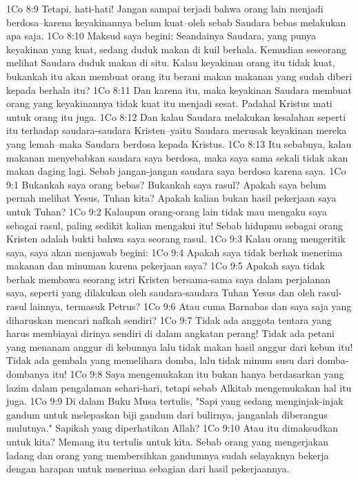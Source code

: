 1Co 8:9  Tetapi, hati-hati! Jangan sampai terjadi bahwa orang lain menjadi berdosa--karena keyakinannya belum kuat--oleh sebab Saudara bebas melakukan apa saja.
1Co 8:10  Maksud saya begini: Seandainya Saudara, yang punya keyakinan yang kuat, sedang duduk makan di kuil berhala. Kemudian seseorang melihat Saudara duduk makan di situ. Kalau keyakinan orang itu tidak kuat, bukankah itu akan membuat orang itu berani makan makanan yang sudah diberi kepada berhala itu?
1Co 8:11  Dan karena itu, maka keyakinan Saudara membuat orang yang keyakinannya tidak kuat itu menjadi sesat. Padahal Kristus mati untuk orang itu juga.
1Co 8:12  Dan kalau Saudara melakukan kesalahan seperti itu terhadap saudara-saudara Kristen--yaitu Saudara merusak keyakinan mereka yang lemah--maka Saudara berdosa kepada Kristus.
1Co 8:13  Itu sebabnya, kalau makanan menyebabkan saudara saya berdosa, maka saya sama sekali tidak akan makan daging lagi. Sebab jangan-jangan saudara saya berdosa karena saya.
1Co 9:1  Bukankah saya orang bebas? Bukankah saya rasul? Apakah saya belum pernah melihat Yesus, Tuhan kita? Apakah kalian bukan hasil pekerjaan saya untuk Tuhan?
1Co 9:2  Kalaupun orang-orang lain tidak mau mengaku saya sebagai rasul, paling sedikit kalian mengakui itu! Sebab hidupmu sebagai orang Kristen adalah bukti bahwa saya seorang rasul.
1Co 9:3  Kalau orang mengeritik saya, saya akan menjawab begini:
1Co 9:4  Apakah saya tidak berhak menerima makanan dan minuman karena pekerjaan saya?
1Co 9:5  Apakah saya tidak berhak membawa seorang istri Kristen bersama-sama saya dalam perjalanan saya, seperti yang dilakukan oleh saudara-saudara Tuhan Yesus dan oleh rasul-rasul lainnya, termasuk Petrus?
1Co 9:6  Atau cuma Barnabas dan saya saja yang diharuskan mencari nafkah sendiri?
1Co 9:7  Tidak ada anggota tentara yang harus membiayai dirinya sendiri di dalam angkatan perang! Tidak ada petani yang menanam anggur di kebunnya lalu tidak makan hasil anggur dari kebun itu! Tidak ada gembala yang memelihara domba, lalu tidak minum susu dari domba-dombanya itu!
1Co 9:8  Saya mengemukakan itu bukan hanya berdasarkan yang lazim dalam pengalaman sehari-hari, tetapi sebab Alkitab mengemukakan hal itu juga.
1Co 9:9  Di dalam Buku Musa tertulis, "Sapi yang sedang menginjak-injak gandum untuk melepaskan biji gandum dari bulirnya, janganlah diberangus mulutnya." Sapikah yang diperhatikan Allah?
1Co 9:10  Atau itu dimaksudkan untuk kita? Memang itu tertulis untuk kita. Sebab orang yang mengerjakan ladang dan orang yang membersihkan gandumnya sudah selayaknya bekerja dengan harapan untuk menerima sebagian dari hasil pekerjaannya.
